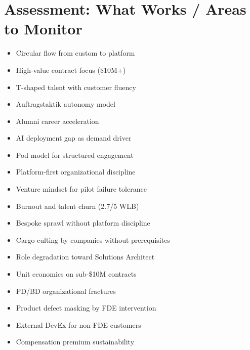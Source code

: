 \section{Assessment: What Works / Areas to Monitor}

\begin{minipage}[t]{0.48\textwidth}
\begin{tcolorbox}[
    colback=white, colframe=msgreen,
    boxrule=1pt, arc=3pt,
    left=6pt, right=6pt, top=6pt, bottom=6pt,
    title={\textcolor{msgreen}{\textbf{What Works}}}
]
\begin{itemize}[leftmargin=10pt, itemsep=2pt]
    \item Circular flow from custom to platform
    \item High-value contract focus (\$10M+)
    \item T-shaped talent with customer fluency
    \item Auftragstaktik autonomy model
    \item Alumni career acceleration
    \item AI deployment gap as demand driver
    \item Pod model for structured engagement
    \item Platform-first organizational discipline
    \item Venture mindset for pilot failure tolerance
\end{itemize}
\end{tcolorbox}
\end{minipage}
\hfill
\begin{minipage}[t]{0.48\textwidth}
\begin{tcolorbox}[
    colback=white, colframe=msred,
    boxrule=1pt, arc=3pt,
    left=6pt, right=6pt, top=6pt, bottom=6pt,
    title={\textcolor{msred}{\textbf{Areas to Monitor}}}
]
\begin{itemize}[leftmargin=10pt, itemsep=2pt]
    \item Burnout and talent churn (2.7/5 WLB)
    \item Bespoke sprawl without platform discipline
    \item Cargo-culting by companies without prerequisites
    \item Role degradation toward Solutions Architect
    \item Unit economics on sub-\$10M contracts
    \item PD/BD organizational fractures
    \item Product defect masking by FDE intervention
    \item External DevEx for non-FDE customers
    \item Compensation premium sustainability
\end{itemize}
\end{tcolorbox}
\end{minipage}


